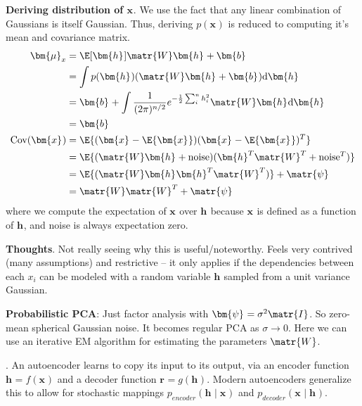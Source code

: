 \documentclass[11pt]{article}
\renewcommand\vec[2][]{\bm{#2}_{#1}}
\newcommand\p{\Needspace{10\baselineskip} \noindent}
\begin{document}
\begin{compactitem}
{\begin{compactitem}
		\item \textbf{Deriving distribution of $\vec{x}$}. We use the fact that any linear combination of Gaussians is itself Gaussian. Thus, deriving $p(\vec{x})$ is reduced to computing it's mean and covariance matrix.
		\begin{align}
			\vec[x]{\mu} &= \E[\vec{h}]{\matr{W} \vec{h} + \vec{b}} \\
			&= \int p(\vec{h}) (\matr{W} \vec{h} + \vec{b}) \mathrm{d}\vec{h} \\
			&= \vec{b} + \int \frac{1}{(2\pi)^{n/2}} e^{-\frac{1}{2} \sum_i^n h_i^2} \matr{W} \vec{h} \mathrm{d}\vec{h} \\
			&= \vec{b} \\
			\text{Cov}(\vec{x}) &= \E{(\vec{x} - \E{\vec{x}}) (\vec{x} - \E{\vec{x}})^T} \\
			&= \E{(\matr{W}\vec{h} + \text{noise})(\vec{h}^T \matr{W}^T + \text{noise}^T)} \\
			&= \E{(\matr{W}\vec{h}\vec{h}^T\matr{W}^T)} + \matr{\psi} \\
			&= \matr{W}\matr{W}^T + \matr{\psi}
		\end{align}
		where we compute the expectation of $\vec{x}$ over $\vec{h}$ because $\vec{x}$ is defined as a function of $\vec{h}$, and noise is always expectation zero.
		\item \textbf{Thoughts}. Not really seeing why this is useful/noteworthy. Feels very contrived (many assumptions) and restrictive -- it only applies if the dependencies between each $x_i$ can be modeled with a random variable $\vec{h}$ sampled from a unit variance Gaussian.
	\end{compactitem}}
	
	
	
	\vspace{0.3em}
	\item \textbf{Probabilistic PCA}: Just factor analysis with $\vec{\psi} = \sigma^2 \matr{I}$. So zero-mean spherical Gaussian noise. It becomes regular PCA as $\sigma \rightarrow 0$. Here we can use an iterative EM algorithm for estimating the parameters $\matr{W}$. 
\end{compactitem}

%
% 

\p {}. An autoencoder learns to copy its input to its output, via an encoder function $\vec{h} = f(\vec{x})$ and a decoder function $\vec{r} = g(\vec{h})$\marginnote{$\vec{r}$ for ``reconstruction''}. Modern autoencoders generalize this to allow for stochastic mappings $p_{encoder}(\vec{h} \mid \vec{x})$ and $p_{decoder}(\vec{x} \mid \vec{h})$.
\end{document}
